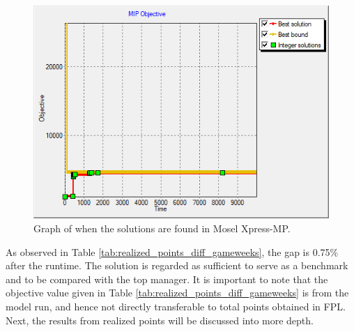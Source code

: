 \begin{figure}[H]
\label{fig:solutions_found_realized_points}    
    \centering
    \includegraphics[scale=0.75]{fig/chapter_7/solution_found_edit_zoom_1.png}
    \caption{Graph of when the solutions are found in Mosel Xpress-MP.}
\end{figure}

As observed in Table \ref{tab:realized_points_diff_gameweeks}, the gap is 0.75\% after the runtime. The solution is regarded as sufficient to serve as a benchmark and to be compared with the top manager. It is important to note that the objective value given in Table \ref{tab:realized_points_diff_gameweeks} is from the model run, and hence not directly transferable to total points obtained in FPL. Next, the results from realized points will be discussed into more depth.

